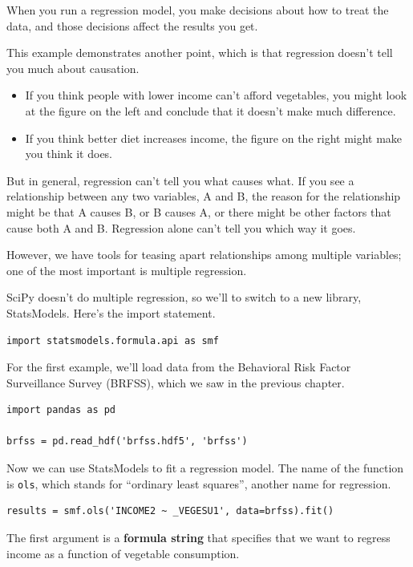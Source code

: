When you run a regression model, you make decisions about how to treat
the data, and those decisions affect the results you get.

This example demonstrates another point, which is that regression
doesn't tell you much about causation.

\begin{itemize}
\item
  If you think people with lower income can't afford vegetables, you
  might look at the figure on the left and conclude that it doesn't make
  much difference.
\item
  If you think better diet increases income, the figure on the right
  might make you think it does.
\end{itemize}

But in general, regression can't tell you what causes what. If you see a
relationship between any two variables, A and B, the reason for the
relationship might be that A causes B, or B causes A, or there might be
other factors that cause both A and B. Regression alone can't tell you
which way it goes.

However, we have tools for teasing apart relationships among multiple
variables; one of the most important is multiple regression.

SciPy doesn't do multiple regression, so we'll to switch to a new
library, StatsModels. Here's the import statement.

\begin{lstlisting}[]
import statsmodels.formula.api as smf
\end{lstlisting}

For the first example, we'll load data from the Behavioral Risk Factor
Surveillance Survey (BRFSS), which we saw in the previous chapter.

\begin{lstlisting}[]
import pandas as pd

brfss = pd.read_hdf('brfss.hdf5', 'brfss')
\end{lstlisting}

Now we can use StatsModels to fit a regression model. The name of the
function is \passthrough{\lstinline!ols!}, which stands for ``ordinary
least squares'', another name for regression.

\begin{lstlisting}[]
results = smf.ols('INCOME2 ~ _VEGESU1', data=brfss).fit()
\end{lstlisting}

The first argument is a \textbf{formula string} that specifies that we
want to regress income as a function of vegetable consumption.


